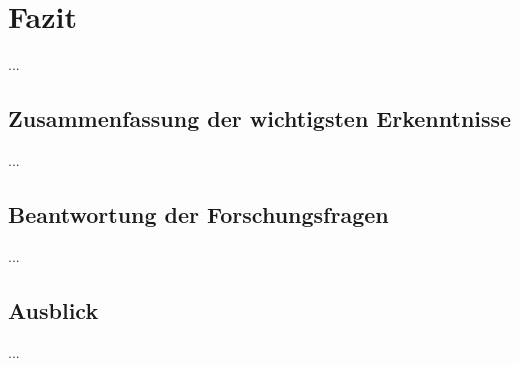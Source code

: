 \chapter{Fazit}

...

\section{Zusammenfassung der wichtigsten Erkenntnisse}

...

\section{Beantwortung der Forschungsfragen}

...

\section{Ausblick}

...